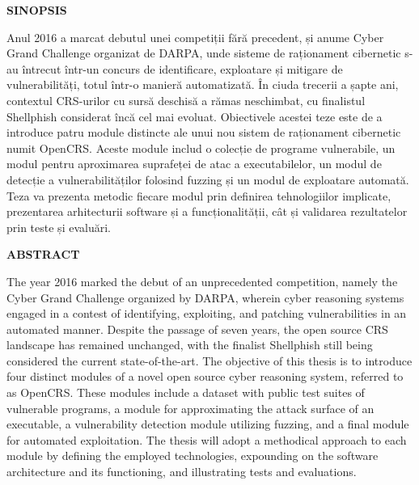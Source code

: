 \newcommand{\AbstractRO}{Anul 2016 a marcat debutul unei competiții fără precedent, și anume Cyber Grand Challenge organizat de DARPA, unde sisteme de raționament cibernetic s-au întrecut într-un concurs de identificare, exploatare și mitigare de vulnerabilități, totul într-o manieră  automatizată. În ciuda trecerii a șapte ani, contextul CRS-urilor cu sursă deschisă a rămas neschimbat, cu finalistul Shellphish considerat încă cel mai evoluat. Obiectivele acestei teze este de a introduce patru module distincte ale unui nou sistem de raționament cibernetic numit OpenCRS. Aceste module includ o colecție de programe vulnerabile, un modul pentru aproximarea suprafeței de atac a executabilelor, un modul de detecție a vulnerabilităților folosind fuzzing și un modul de exploatare automată. Teza va prezenta metodic fiecare modul prin definirea tehnologiilor implicate, prezentarea arhitecturii software și a funcționalității, cât și validarea rezultatelor prin teste și evaluări.}

\newcommand{\AbstractEN}{The year 2016 marked the debut of an unprecedented competition, namely the Cyber Grand Challenge organized by DARPA, wherein cyber reasoning systems engaged in a contest of identifying, exploiting, and patching vulnerabilities in an automated manner. Despite the passage of seven years, the open source CRS landscape has remained unchanged, with the finalist Shellphish still being considered the current state-of-the-art. The objective of this thesis is to introduce four distinct modules of a novel open source cyber reasoning system, referred to as OpenCRS. These modules include a dataset with public test suites of vulnerable programs, a module for approximating the attack surface of an executable, a vulnerability detection module utilizing fuzzing, and a final module for automated exploitation. The thesis will adopt a methodical approach to each module by defining the employed technologies, expounding on the software architecture and its functioning, and illustrating tests and evaluations.}

\begin{titlepage}
  \textbf{\large SINOPSIS}\par
  \AbstractRO\par\vfill
  \textbf{\large ABSTRACT}\par
  \AbstractEN \vfill
\end{titlepage}